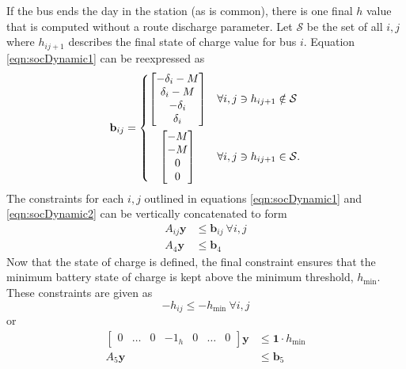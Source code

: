 If the bus ends the day in the station (as is common), there is one final $h$ value that is computed without a route discharge parameter. Let $\mathcal{S}$ be the set of all $i,j$ where $h_{ij+1}$ describes the final state of charge value for bus $i$. Equation \ref{eqn:socDynamic1} can be reexpressed as 
\begin{equation}\label{eqn:socDynamic2} 
	\mathbf{b}_{ij} = 
	\begin{dcases}
		\begin{bmatrix} -\delta_i - M \\
			         \delta_i - M \\
		                -\delta_i     \\
		                 \delta_i 
		\end{bmatrix} & \forall i,j \ni h_{ij+1} \notin \mathcal{S} \\
		\omit \hfil$\begin{bmatrix} - M \\
		                - M \\
		                  0 \\
		                  0 
		\end{bmatrix}$\hfil & \forall i,j \ni h_{ij+1} \in \mathcal{S}.
	\end{dcases}
\end{equation}
The constraints for each $i,j$ outlined in equations \ref{eqn:socDynamic1} and \ref{eqn:socDynamic2} can be vertically concatenated to form
\begin{equation}\label{eqn:socDynamic3} \begin{aligned}
	A_{ij}\mathbf{y} &\le \mathbf{b}_{ij} \ \forall i,j \\
	A_4\mathbf{y} &\le \mathbf{b}_4
\end{aligned} \end{equation}
Now that the state of charge is defined, the final constraint ensures that the minimum battery state of charge is kept above the minimum threshold, $h_{\text{min}}$. These constraints are given as
\begin{equation}
	-h_{ij} \le -h_{\text{min}} \ \forall i,j
\end{equation}
or 
\begin{equation} \begin{aligned}
	\begin{bmatrix}0 & \hdots & 0 & -1_{h} & 0 & \hdots & 0\end{bmatrix} \mathbf{y} &\le \mathbf{1}\cdot h_{\text{min}}\\ 
		A_5\mathbf{y} &\le \mathbf{b}_5
\end{aligned} \end{equation}
